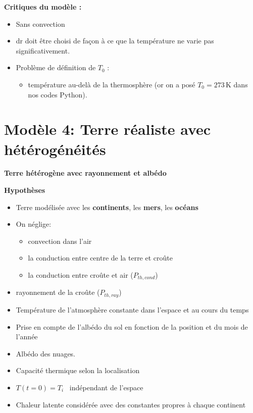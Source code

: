 \documentclass[a4paper,12pt]{article}
\begin{document}
\vspace{1cm}
\textbf{Critiques du modèle :}
\begin{itemize}
    \item Sans convection
    \item dr doit être choisi de façon à ce que la température ne varie pas significativement.
    \item Problème de définition de $T_0$ :
    \begin{itemize}
        \item température au-delà de la thermosphère (or on a posé $T_0 = 273\, \mathrm{K}$ dans nos codes Python).
    
    \end{itemize}
\end{itemize}

\newpage

\section{Modèle 4: Terre réaliste avec hétérogénéités }
\label{sec:modèle 4}
{\Large \textbf{Terre hétérogène avec rayonnement et albédo}}

\vspace{0.5cm} 
\textbf{Hypothèses}


\begin{itemize}
    \item Terre modélisée avec les \textbf{continents}, les \textbf{mers}, les \textbf{océans}
    \item  On néglige: 
    \begin{itemize}
        \item convection dans l'air
        \item la conduction entre centre de la terre et croûte
        \item la conduction entre croûte et air (\(P_{th,cond}\))
    \end{itemize} 
    \item  rayonnement de la croûte (\(P_{th,ray}\))
    \item Température de l'atmosphère constante dans l'espace et au cours du temps 
    \item Prise en compte de l'albédo du sol en fonction de la position et du mois de l'année 
    \item Albédo des nuages.
    \item Capacité thermique selon la localisation
    \item $T(t=0) = T_i$ \  indépendant de l'espace  
    \item Chaleur latente considérée avec des constantes propres à chaque continent\\
    
    
    
    
\end{itemize}
\end{document}
